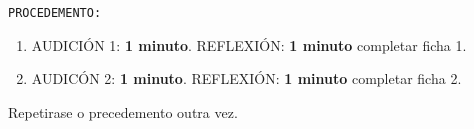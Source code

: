 %
\begin{instruccions}

\begin{center}
\texttt{PROCEDEMENTO:}    
\end{center}
\begin{enumerate}
    \item
    AUDICIÓN 1: \textbf{1 minuto}. 
    REFLEXIÓN: \textbf{1 minuto} completar ficha 1.
    \item 
    AUDICÓN 2: \textbf{1 minuto}. 
    REFLEXIÓN: \textbf{1 minuto} completar ficha 2.
\end{enumerate}
\begin{center}
    Repetirase o precedemento outra vez.
\end{center} 
\end{instruccions}
\vspace*{0.15cm}
